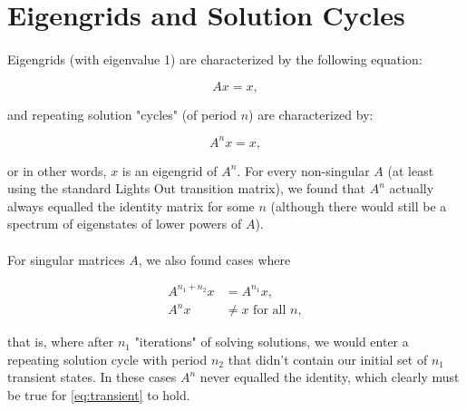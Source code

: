 \documentclass[11pt]{article}
\begin{document}
\section*{Eigengrids and Solution Cycles}

\paragraph{} Eigengrids (with eigenvalue 1) are characterized by the following equation:

\begin{equation}
Ax = x,
\end{equation}

\noindent and repeating solution "cycles" (of period $n$) are characterized by:

\begin{equation}
A^nx = x,
\end{equation}

\noindent or in other words, $x$ is an eigengrid of $A^n$. For every non-singular $A$ (at least using the standard Lights Out transition matrix), we found that $A^n$ actually always equalled the identity matrix for some $n$ (although there would still be a spectrum of eigenstates of lower powers of $A$).

\paragraph{} For singular matrices $A$, we also found cases where

\begin{equation}
\begin{split}
  A^{n_1 + n_2}x & = A^{n_1}x,\\
  A^{n}x & \neq x \text{ for all } n,
\end{split}
\label{eq:transient}
\end{equation}

\noindent that is, where after $n_1$ "iterations" of solving solutions, we would enter a repeating solution cycle with period $n_2$ that didn't contain our initial set of $n_1$ transient states. In these cases $A^n$ never equalled the identity, which clearly must be true for \eqref{eq:transient} to hold.
\end{document}
